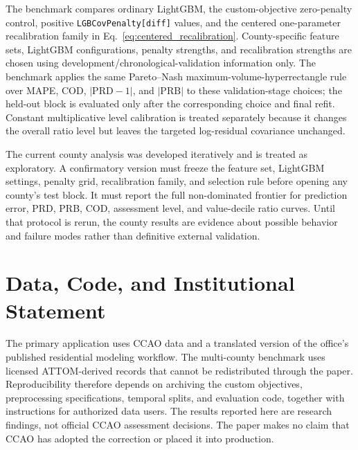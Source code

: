 \documentclass[10pt]{article}
\theoremstyle{definition}
\newcommand{\1}{\mathbf{1}}
\newcommand{\advisorchange}[1]{{\color{blue}#1}}
\newcommand{\newtext}[1]{\textcolor{impGreen}{#1}}
\begin{document}
\newtext{The benchmark compares ordinary LightGBM, the custom-objective zero-penalty control, positive \texttt{LGBCovPenalty[diff]} values, and the centered one-parameter recalibration family in Eq.~\eqref{eq:centered_recalibration}. County-specific feature sets, LightGBM configurations, penalty strengths, and recalibration strengths are chosen using development/chronological-validation information only. The benchmark applies the same Pareto--Nash maximum-volume-hyperrectangle rule over MAPE, COD, $|\mathrm{PRD}-1|$, and $|\mathrm{PRB}|$ to these validation-stage choices; the held-out block is evaluated only after the corresponding choice and final refit. Constant multiplicative level calibration is treated separately because it changes the overall ratio level but leaves the targeted log-residual covariance unchanged.}

The current county analysis was developed iteratively and is treated as exploratory. A confirmatory version must freeze the feature set, LightGBM settings, penalty grid, recalibration family, and selection rule before opening any county's test block. It must report the full non-dominated frontier for prediction error, PRD, PRB, COD, assessment level, and value-decile ratio curves. Until that protocol is rerun, the county results are evidence about possible behavior and failure modes rather than definitive external validation.

\section*{Data, Code, and Institutional Statement}

\advisorchange{The primary application uses CCAO data} and a translated version of the office's published residential modeling workflow. The multi-county benchmark uses licensed ATTOM-derived records that cannot be redistributed through the paper. Reproducibility therefore depends on archiving the custom objectives, preprocessing specifications, temporal splits, and evaluation code, together with instructions for authorized data users. The results reported here are research findings, not official CCAO assessment decisions. The paper makes no claim that CCAO has adopted the correction or placed it into production.
\end{document}
